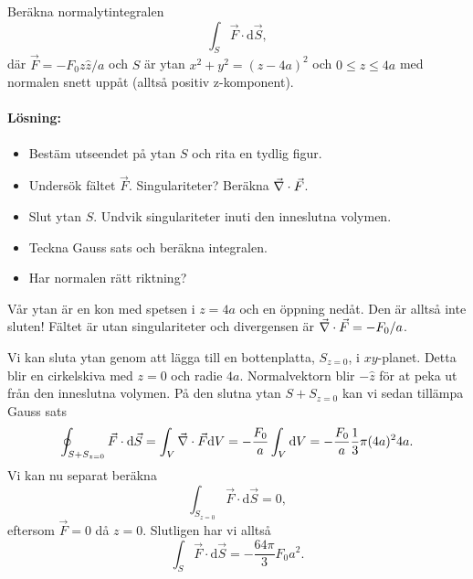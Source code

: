 \documentclass[%
oneside,                 %
final,                   %
10pt]{article}
\newenvironment{notice_mdfboxadmon}[1][]{
\begin{notice_mdfboxmdframed}[frametitle=#1]
}
{
\end{notice_mdfboxmdframed}
}
\begin{document}
\begin{notice_mdfboxadmon}

Beräkna normalytintegralen
\begin{equation}
\int_S \vec{F} \cdot \mbox{d}\vec{S},
\end{equation}
där $\vec{F} = -F_0 z \hat{z} / a$ och $S$ är ytan $x^2 + y^2 = (z-4a)^2$ och $0\le z \le 4a$ med normalen snett uppåt (alltså positiv z-komponent).

\paragraph{Lösning:}
\begin{itemize}
\item Bestäm utseendet på ytan $S$ och rita en tydlig figur.

\item Undersök fältet $\vec{F}$. Singulariteter? Beräkna $\vec{\nabla} \cdot \vec{F}$.

\item Slut ytan $S$. Undvik singulariteter inuti den inneslutna volymen.

\item Teckna Gauss sats och beräkna integralen.

\item Har normalen rätt riktning?
\end{itemize}

\noindent
Vår ytan är en kon med spetsen i $z=4a$ och en öppning nedåt. Den är alltså inte sluten! Fältet är utan singulariteter och divergensen är $\vec{\nabla} \cdot \vec{F} = -F_0 / a$.

Vi kan sluta ytan genom att lägga till en bottenplatta, $S_{z=0}$, i $xy$-planet. Detta blir en cirkelskiva med $z=0$ och radie $4a$. Normalvektorn blir $-\hat{z}$ för at peka ut från den inneslutna volymen. På den slutna ytan $S+S_{z=0}$ kan vi sedan tillämpa Gauss sats
\begin{equation}
  \oint_{S+S_{z=0}} \vec{F} \cdot \mbox{d}\vec{S} = \int_V \vec{\nabla} \cdot \vec{F}
\mbox{d}V = -\frac{F_0}{a}\int_V\mbox{d}V = -\frac{F_0}{a} \frac{1}{3} \pi (4a)^2 4a.
\end{equation}
Vi kan nu separat beräkna
\begin{equation}
  \int_{S_{z=0}} \vec{F} \cdot \mbox{d}\vec{S} = 0,
\end{equation}
eftersom $\vec{F}=0$ då $z=0$.  Slutligen har vi alltså 
\begin{equation}
  \int_S \vec{F} \cdot \mbox{d}\vec{S} = -\frac{64\pi}{3} F_0 a^2.
\end{equation}
\end{notice_mdfboxadmon} %
\end{document}
